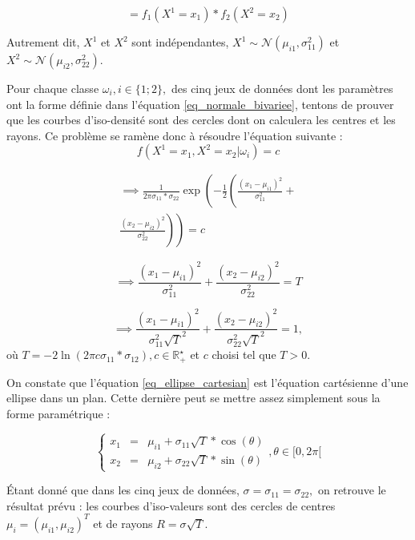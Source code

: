 \documentclass{article}
\begin{document}
\begin{multicols}{2}
\[
= f_1(X^1 = x_1) * f_2 (X^2 = x_2)
\]

Autrement dit, $X^1$ et $X^2$ sont indépendantes, $X^1 \sim \mathcal{N}( \mu_{i1}, \sigma_{11}^2 )$ et $X^2 \sim \mathcal{N}( \mu_{i2}, \sigma_{22}^2 )$.


Pour chaque classe $\omega_i, i \in \{1 ; 2 \},$ des cinq jeux de données dont les paramètres ont la forme définie dans l'équation \ref{eq_normale_bivariee}, tentons de prouver que les courbes d'iso-densité sont des cercles dont on calculera les centres et les rayons. Ce problème se ramène donc à résoudre l'équation suivante :
\[
f(X^1 = x_1, X^2 = x_2 | \omega_i) = c
\]

\[
\begin{split}
\implies \frac{1}{2\pi \sigma_{11} * \sigma_{22}} \exp \left( -\frac{1}{2} \left( \frac{(x_1 - \mu_{i1})^2}{\sigma_{11}^2} + \right. \right. 
\\ \left. \left. \frac{(x_2 - \mu_{i2})^2}{\sigma_{22}^2} \right) \right)
= c
\end{split}
\]

\[
\implies \frac{(x_1 - \mu_{i1})^2}{\sigma_{11}^2} + \frac{(x_2 - \mu_{i2})^2}{\sigma_{22}^2} = T
\]

\begin{equation}
\label{eq_ellipse_cartesian}
\implies \frac{(x_1 - \mu_{i1})^2}{\sigma_{11}^2 \sqrt{T}^2} + \frac{(x_2 - \mu_{i2})^2}{\sigma_{22}^2 \sqrt{T}^2} = 1,
\end{equation}
où $T = -2 \ln(2\pi c \sigma_{11} * \sigma_{12}), c \in \mathbb{R}_+^{\star}$ et $c$ choisi tel que $T > 0$.

On constate que l'équation \ref{eq_ellipse_cartesian} est l'équation cartésienne d'une ellipse dans un plan. Cette dernière peut se mettre assez simplement sous la forme paramétrique :

\begin{equation}
  \label{eq_ellipse_parametrique}
  \left\{
    \begin{array}{rcl}
    	x_1 & = & \mu_{i1} + \sigma_{11} \sqrt{T} * \cos(\theta)\\ 
        x_2 & = & \mu_{i2} + \sigma_{22} \sqrt{T} * \sin(\theta)
    \end{array},
  \right.\theta \in [0, 2 \pi[
\end{equation}

Étant donné que dans les cinq jeux de données, $\sigma = \sigma_{11} = \sigma_{22},$ on retrouve le résultat prévu : les courbes d'iso-valeurs sont des cercles de centres $\mu_i = (\mu_{i1}, \mu_{i2})^T $ et de rayons $R = \sigma \sqrt{T}$.


\end{multicols}
\end{document}
